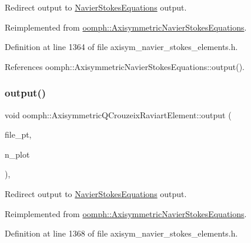 Redirect output to \hyperlink{classoomph_1_1NavierStokesEquations}{Navier\+Stokes\+Equations} output. 



Reimplemented from \hyperlink{classoomph_1_1AxisymmetricNavierStokesEquations_a61129dd7505ac363862946bd8b3ea5bf}{oomph\+::\+Axisymmetric\+Navier\+Stokes\+Equations}.



Definition at line 1364 of file axisym\+\_\+navier\+\_\+stokes\+\_\+elements.\+h.



References oomph\+::\+Axisymmetric\+Navier\+Stokes\+Equations\+::output().

\mbox{\label{classoomph_1_1AxisymmetricQCrouzeixRaviartElement_a04743e5848f04627a7069879f4da8389}} 
\subsubsection{\texorpdfstring{output()}{output()}\hspace{0.1cm}{\footnotesize\ttfamily [4/4]}}
{\footnotesize\ttfamily void oomph\+::\+Axisymmetric\+Q\+Crouzeix\+Raviart\+Element\+::output (\begin{DoxyParamCaption}\item[{F\+I\+LE $\ast$}]{file\+\_\+pt,  }\item[{const unsigned \&}]{n\+\_\+plot }\end{DoxyParamCaption})\hspace{0.3cm}{\ttfamily [inline]}, {\ttfamily [virtual]}}



Redirect output to \hyperlink{classoomph_1_1NavierStokesEquations}{Navier\+Stokes\+Equations} output. 



Reimplemented from \hyperlink{classoomph_1_1AxisymmetricNavierStokesEquations_abc2ca00250845e243da3f4e0845b2c96}{oomph\+::\+Axisymmetric\+Navier\+Stokes\+Equations}.



Definition at line 1368 of file axisym\+\_\+navier\+\_\+stokes\+\_\+elements.\+h.



